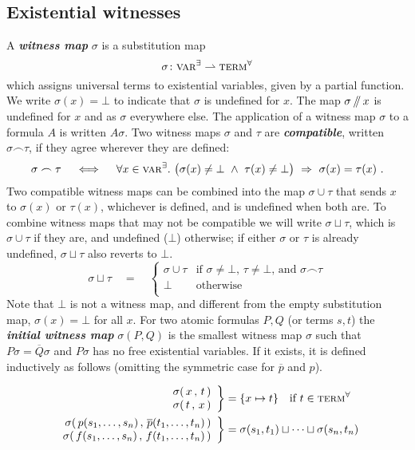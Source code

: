 \documentclass{article}
\theoremstyle{definition}
\theoremstyle{plain}
\newcommand\defn[1]{\textit{\textbf{#1}}}
\newcommand\varE{\textsc{var}^\exists}
\newcommand\termsA{\textsc{term}^\forall}
\newcommand\+{+}
\renewcommand\*{\times}
\newcommand\dual[1]{\overline{#1}}
\newcommand\comp\frown
\newcommand\ubot\sqcup
\newcommand\minus{\mathop{/\mathchoice{\kern-3pt}{\kern-3pt}{\kern-2.5pt}{\kern-2pt}/}}
\begin{document}

\subsection{Existential witnesses}

A \defn{witness map} $\sigma$ is a substitution map
\[
	\sigma\colon \varE \rightharpoonup \termsA
\]
which assigns universal terms to existential variables, given by a partial function. We write $\sigma(x)=\bot$ to indicate that $\sigma$ is undefined for $x$. The map $\sigma\minus x$ is undefined for $x$ and as $\sigma$ everywhere else. The application of a witness map $\sigma$ to a formula $A$ is written $A\sigma$. Two witness maps $\sigma$ and $\tau$ are \defn{compatible}, written $\sigma\comp\tau$, if they agree wherever they are defined:
\[
	\sigma\comp\tau \quad\iff\quad \forall x\in\varE.~\big(\sigma(x)\neq\bot~\wedge~\tau(x)\neq\bot\big)~\Rightarrow~\sigma(x)=\tau(x)~.
\]
Two compatible witness maps can be combined into the map $\sigma\cup\tau$ that sends $x$ to $\sigma(x)$ or $\tau(x)$, whichever is defined, and is undefined when both are. To combine witness maps that may not be compatible we will write $\sigma\ubot\tau$, which is $\sigma\cup\tau$ if they are, and undefined ($\bot$) otherwise; if either $\sigma$ or $\tau$ is already undefined, $\sigma\ubot\tau$ also reverts to $\bot$.
\[
	\sigma\ubot\tau\quad=\quad
	\left\{\begin{array}{ll}
		\sigma\cup\tau	& \text{if $\sigma\neq\bot$, $\tau\neq\bot$, and $\sigma\comp\tau$} \\
		\bot			& \text{otherwise} \\
	\end{array}\right.
\] 
Note that $\bot$ is not a witness map, and different from the empty substitution map, $\sigma(x)=\bot$ for all $x$. For two atomic formulas $P,Q$ (or terms $s,t$) the \defn{initial witness map} $\sigma(P,Q)$ is the smallest witness map $\sigma$ such that $P\sigma=\dual Q\sigma$ and $P\sigma$ has no free existential variables. If it exists, it is defined inductively as follows (omitting the symmetric case for $\dual p$ and $p$). 

\begin{align*}
	\left.\begin{array}{r}
		\sigma(\,x\,,\,t\,) \\
	 	\sigma(\,t\,,\,x\,)
	\end{array}\right\}
	& = \{ x\mapsto t \}\quad \text{if $t\in\termsA$}
 \\
	\left.\begin{array}{r}
		\sigma(\,p(s_1,\dots,s_n)\,,\,\dual p(t_1,\dots,t_n)\,) \\
		\sigma(\,f(s_1,\dots,s_n)\,,\,f(t_1,\dots,t_n)\,)
	\end{array}\right\}
	& = \sigma(s_1,t_1)\ubot\dots\ubot\sigma(s_n,t_n)
\end{align*}
\end{document}
